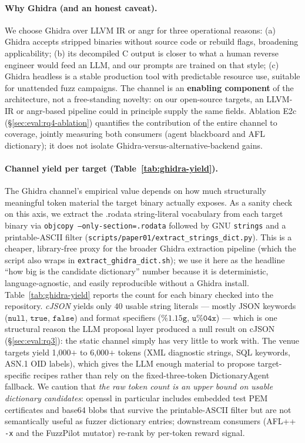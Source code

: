\documentclass[11pt]{article}
\begin{document}
\paragraph{Why Ghidra (and an honest caveat).}
We choose Ghidra over LLVM IR or angr for three operational
reasons: (a) Ghidra accepts stripped binaries without source code
or rebuild flags, broadening applicability; (b) its decompiled C
output is closer to what a human reverse engineer would feed an
LLM, and our prompts are trained on that style; (c) Ghidra
headless is a stable production tool with predictable resource
use, suitable for unattended fuzz campaigns. The channel is
an \textbf{enabling component} of the architecture, not a
free-standing novelty: on our open-source targets, an LLVM-IR or
angr-based pipeline could in principle supply the same fields.
Ablation E2c (\S\ref{sec:eval:rq4-ablation}) quantifies the contribution
of the entire channel to coverage, jointly measuring both
consumers (agent blackboard and AFL dictionary); it does not
isolate Ghidra-versus-alternative-backend gains.

\paragraph{Channel yield per target (Table~\ref{tab:ghidra-yield}).}
The Ghidra channel's empirical value depends on how much
structurally meaningful token material the target binary actually
exposes. As a sanity check on this axis, we extract the .rodata
string-literal vocabulary from each target binary via
\texttt{objcopy --only-section=.rodata} followed by GNU
\texttt{strings} and a printable-ASCII filter
(\texttt{scripts/paper01/extract\_strings\_dict.py}). This is a
cheaper, library-free proxy for the broader Ghidra extraction
pipeline (which the script also wraps in
\texttt{extract\_ghidra\_dict.sh}); we use it here as the headline
``how big is the candidate dictionary'' number because it is
deterministic, language-agnostic, and easily reproducible without
a Ghidra install. Table~\ref{tab:ghidra-yield} reports the count
for each binary checked into the repository.
\emph{cJSON} yields only $40$ usable string literals --- mostly
JSON keywords ($\mathtt{null}$, $\mathtt{true}$, $\mathtt{false}$)
and format specifiers ($\mathtt{\%1.15g}$, $\mathtt{u\%04x}$) ---
which is one structural reason the LLM proposal layer produced a
null result on cJSON (\S\ref{sec:eval:rq3}): the static channel
simply has very little to work with. The venue targets yield
1{,}000$+$ to 6{,}000$+$ tokens (XML diagnostic strings, SQL
keywords, ASN.1 OID labels), which gives the LLM enough material
to propose target-specific recipes rather than rely on the
fixed-three-token DictionaryAgent fallback. We caution that
\emph{the raw token count is an upper bound on usable dictionary
candidates}: openssl in particular includes embedded test PEM
certificates and base64 blobs that survive the printable-ASCII
filter but are not semantically useful as fuzzer dictionary
entries; downstream consumers (AFL++ \texttt{-x} and the
FuzzPilot mutator) re-rank by per-token reward signal.
\end{document}
